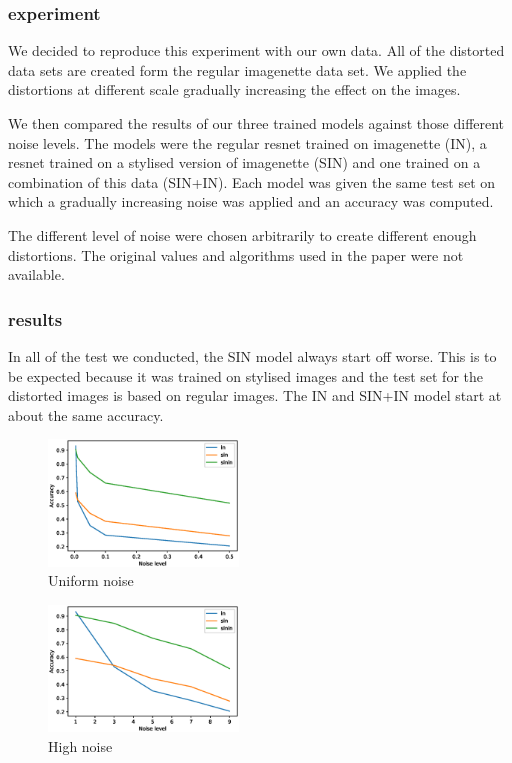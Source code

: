 \documentclass{article}
\begin{document}
\subsubsection{experiment}

We decided to reproduce this experiment with our own data.
All of the distorted data sets are created form the regular imagenette data set. We applied the distortions at different scale gradually increasing the effect on the images.

We then compared the results of our three trained models against those different noise levels.
The models were the regular resnet trained on imagenette (IN), a resnet trained on a stylised version of imagenette (SIN) and one trained on a combination of this data (SIN+IN).
Each model was given the same test set on which a gradually increasing noise was applied and an accuracy was computed.

The different level of noise were chosen arbitrarily to create different enough distortions. The original values and algorithms used in the paper were not available.

\subsubsection{results}

In all of the test we conducted, the SIN model always start off worse. This is to be expected because it was trained on stylised images and the test set for the distorted images is based on regular images. The IN and SIN+IN model start at about the same accuracy.

\begin{figure}[h!]
\centering
\includegraphics[width = 0.45\textwidth]{imgs/uniform}
\caption{Uniform noise}
\end{figure}

\begin{figure}[h!]
\centering
\includegraphics[width = 0.45\textwidth]{imgs/high_pass}
\caption{High noise}
\end{figure}
\end{document}
